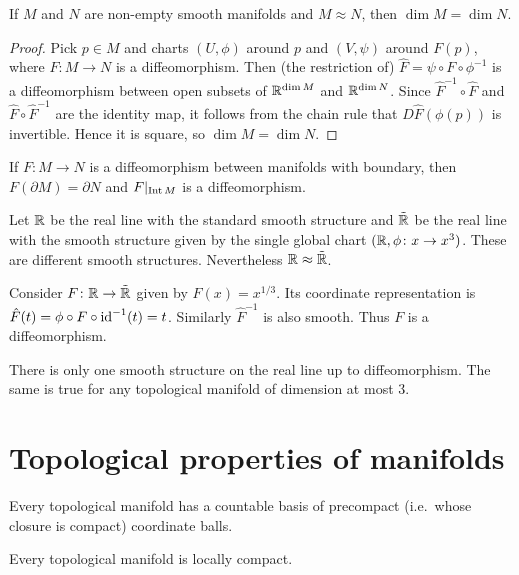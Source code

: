 \documentclass{skript}
\begin{document}
\begin{thm}
    If $M$ and $N$ are non-empty smooth manifolds and $M\approx N$, then $\dim M = \dim N$.
\end{thm}
\begin{proof}
    Pick $p\in M$ and charts $(U,\phi)$ around $p$ and $(V,\psi)$ around $F(p)$, where $F\colon M\to N$ is a diffeomorphism. 
    Then (the restriction of) $\hat F = \psi\circ F\circ \phi^{-1}$ is a diffeomorphism between open subsets of $\mathbb{R}^{\dim M}$  and $\mathbb{R}^{\dim N}$.
    Since $\hat F^{-1} \circ \hat F$ and $\hat F\circ\hat F^{-1}$ are the identity map, it follows from the chain rule that $D\hat F(\phi(p))$ is invertible.
    Hence it is square, so $\dim M = \dim N$.
\end{proof}

\begin{thm}
    If $F\colon M\to N$ is a diffeomorphism between manifolds with boundary, then $F(\partial M) = \partial N$ and $F|_{\operatorname{Int} M}$ is a diffeomorphism.
\end{thm}

\begin{bsp}
    Let $\mathbb{R}$ be the real line with the standard smooth structure and $\tilde {\mathbb{R}}$ be the real line with the smooth structure given by the single global chart $(\mathbb{R}, \phi\colon x\to x^3)$. 
    These are different smooth structures. 
    Nevertheless $\mathbb{R} \approx \tilde{\mathbb{R}}$.

    Consider $F\colon \mathbb{R}\to\tilde{\mathbb{R}}$ given by $F(x) = x^{1/3}$. 
    Its coordinate representation is $\hat F(t) = \phi\circ F\circ \mathrm{id}^{-1}(t) = t$. 
    Similarly $\hat F^{-1}$ is also smooth. 
    Thus $F$ is a diffeomorphism.
\end{bsp}

\begin{fact}
    There is only one smooth structure on the real line up to diffeomorphism.
    The same is true for any topological manifold of dimension at most $3$.
\end{fact}

\section{Topological properties of manifolds}
\begin{lemma}
    Every topological manifold has a countable basis of precompact (i.e.\ whose closure is compact) coordinate balls.
\end{lemma}

\begin{cor}
    Every topological manifold is locally compact.
\end{cor}
\end{document}
